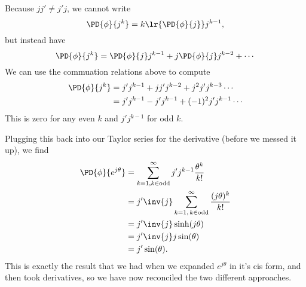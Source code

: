 {Because \( j j' \ne j' j \), we cannot write
\begin{equation}\label{eqn:dexpquestion:99}
\PD{\phi}{j^k} = k \lr{ \PD{\phi}{j} } j^{k-1},
\end{equation}
but instead have
\begin{equation}\label{eqn:dexpquestion:100}
\PD{\phi}{j^k} = \PD{\phi}{j} j^{k-1} + j \PD{\phi}{j} j^{k-2} + \cdots
\end{equation}
We can use the commuation relations above to compute
\begin{equation}\label{eqn:dexpquestion:260}
\begin{aligned}
\PD{\phi}{j^k}
&= j' j^{k-1} + j j' j^{k-2} + j^2 j' j^{k-3} \cdots \\
&= j' j^{k-1} - j' j^{k-1} + (-1)^2 j' j^{k-1} \cdots
\end{aligned}
\end{equation}
This is zero for any even \( k \) and \( j' j^{k-1} \) for odd \( k \).

Plugging this back into our Taylor series for the derivative (before we messed it up), we find
\begin{equation}\label{eqn:dexpquestion:280}
\begin{aligned}
\PD{\phi}{e^{j\theta}}
&= \sum_{k = 1, k \in \mathrm{odd}}^\infty j' j^{k-1} \frac{ \theta^k }{k!} \\
&= j' \inv{j}
\sum_{k = 1,\, k \in \mathrm{odd}}^\infty \frac{ (j\theta)^k }{k!} \\
&= j' \inv{j} \sinh( j \theta ) \\
&= j' \inv{j} j \sin( \theta ) \\
&= j' \sin( \theta ).
\end{aligned}
\end{equation}
This is exactly the result that we had when we expanded \( e^{j\theta} \) in it's cis form, and then took derivatives, so we have now reconciled the two different approaches.
} %
